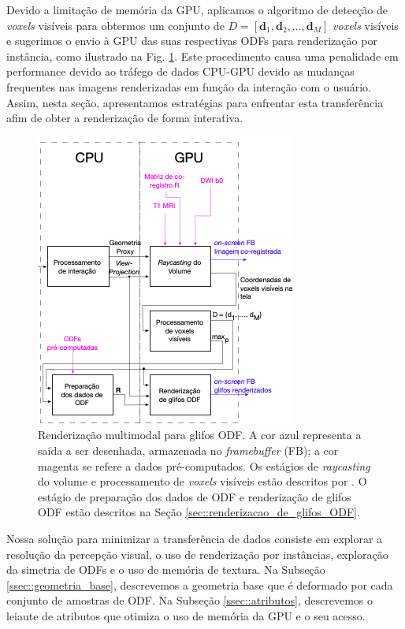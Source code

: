 \documentclass[
    12pt,                %
    oneside,            %
    a4paper,            %
    english,            %
    french,                %
    spanish,            %
    brazil                %
    ]{abntex2}
\begin{document}
Devido a limitação de memória da GPU,  aplicamos o algoritmo de detecção de \textit{voxels} visíveis \cite{voltoline2021} para obtermos um conjunto de $D = [
\mathbf{d}_1,
\mathbf{d}_2, ..., 
\mathbf{d}_M
]$ \textit{voxels} visíveis e sugerimos o envio à GPU das suas respectivas ODFs para renderização por instância, como ilustrado na Fig. \ref{fig::vmtk_simplified}. Este procedimento causa uma penalidade em performance devido ao tráfego de dados CPU-GPU devido as mudanças frequentes nas imagens renderizadas em função da interação com o usuário. Assim, nesta seção, apresentamos estratégias para enfrentar esta transferência afim de obter a renderização de forma interativa.


\begin{figure}[ht]
    \centering
    \includegraphics[width=.7\linewidth, angle=0]{figs/Esquema_Glifo/fluxograma_glifos_VMTK.png}
    \caption{
    Renderização multimodal para glifos ODF. A cor azul representa a saída a ser desenhada, armazenada no \textit{framebuffer} (FB); a cor magenta se refere a dados pré-computados. Os estágios de \textit{raycasting} do volume e processamento de \textit{voxels} visíveis estão descritos por . O estágio de preparação dos dados de ODF e renderização de glifos ODF estão descritos na Seção \ref{sec::renderizacao_de_glifos_ODF}.
    }
    \label{fig::vmtk_simplified}
\end{figure}

Nossa solução para minimizar a transferência de dados consiste em explorar a resolução da percepção visual, o uso de renderização por instâncias, exploração da simetria de ODFs e o uso de memória de textura. Na Subseção \ref{ssec::geometria_base}, descrevemos a geometria base que é deformado por cada conjunto de amostras de ODF. Na Subseção \ref{ssec::atributos}, descrevemos o leiaute de atributos que otimiza o uso de memória da GPU e o seu acesso.
\end{document}
